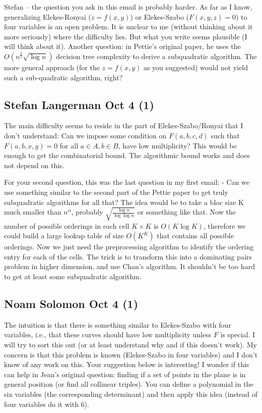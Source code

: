 Stefan -- the question you ask in this email is probably harder. As far as I
know, generalizing Elekes-Ronyai ($z=f(x,y)$) or Elekes-Szabo ($F(x,y,z)=0$) to
four variables is an open problem. It is unclear to me (without thinking
about it more seriously) where the difficulty lies. But what you write
seems plausible (I will think about it).
Another question: in Pettie's original paper, he uses the
$O(n^{\frac{3}{2}}\sqrt{\log n})$ decision tree complexity to derive a subquadratic
algorithm. The more general approach (for the $z=f(x,y)$ as you suggested)
would not yield such a sub-quadratic algorithm, right?

\subsection{Stefan Langerman Oct 4 (1)}
The main difficulty seems to reside in the part of
Elekes-Szabo/Ronyai that I don't understand: Can we impose some
condition on $F(a,b,c,d)$ such that $F(a,b,x,y)=0$ for all $a \in A, b \in B$,
have low multiplicity?
This would be enough to get the combinatorial bound.
The algorithmic bound works and does not depend on this.

For your second question, this was the last question in my first email:
- Can we use something similar to the second part of the Pettie paper
to get truly subquadratic algorithms for all that?
The idea would be to take a bloc size K much smaller than $n^\alpha$,
probably $\sqrt{\frac{\log n}{\log \log n}}$ or something like that. Now the number
of possible orderings in each cell \(K\times K\) is $O(K \log K)$, therefore we
could build a large lookup table of size $O(K^K)$ that contains all
possible orderings. Now we just need the preprocessing algorithm to
identify the ordering entry for each of the cells.
The trick is to transform this into a dominating pairs problem in
higher dimension, and use Chan's algorithm. It shouldn't be too hard
to get at least some subquadratic algorithm.

\subsection{Noam Solomon Oct 4 (1)}
The intuition is that there is something similar to Elekes-Szabo with four
variables, i.e., that these curves should have low multiplicity unless $F$ is
special. I will try to sort this out (or at least understand why and if
this doesn't work). My concern is that this problem is known (Elekes-Szabo
in four variables) and I don't know of any work on this.
Your suggestion below is interesting!
I wonder if this can help in Jean's original question: finding if a set of
points in the plane is in general position (or find all collinear triples).
You can define a polynomial in the six variables (the corresponding
determinant) and then apply this idea (instead of four variables do it with
6).

